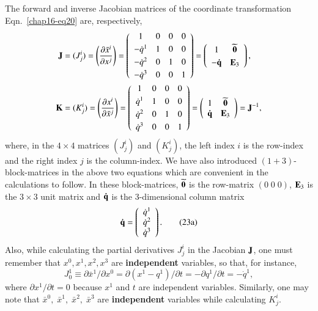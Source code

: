 The forward and inverse Jacobian matrices of the coordinate transformation  Eqn.~\eqref{chap16-eq20} are, respectively, 
\begin{align}
\mathbf{J} &=(J^i_j)=\left(\frac{\partial \bar{x}^i}{\partial x^j}\right)=\left(\begin{array}{cccc}1&0&0&0\\[3pt]
-\dot{q}^{1}&1&0&0\\[3pt]
-\dot{q}^{2}&0&1&0 \\[3pt]
-\dot{q}^{3}&0&0&1 \end{array}\right)
=\left(\begin{array}{cc} 1 & \widetilde{\mathbf{0}}\\[3pt]
-\mathbf{\dot{q}} & \mathbf{E}_3 \end{array}\right),\label{chap16-eq22} \\
\mathbf{K}&=(K^i_j)=\left(\frac{\partial x^i}{\partial 
\bar x^j}\right)=\left(\begin{array}{cccc}1&0&0&0\\[3pt]
\dot{q}^{1}&1&0&0\\[3pt]
\dot{q}^{2}&0&1&0 \\[3pt]
\dot{q}^{3}&0&0&1 \end{array}\right)
= \left(\begin{array}{cc} 1 &\widetilde{\mathbf{0}}\\
\mathbf{\dot{q}} & {\mathbf{E}}_3 \end{array}\right)
=\mathbf{J}^{-1},\label{chap16-eq23}
\end{align}
where, in the $4\times4$ matrices $(J^i_j)$ and $(K^i_j)$, the left  index $i$ is the row-index and the right index $j$ is the column-index.  We have also introduced $(1+3)$-block-matrices in the above two equations which are convenient in the calculations to follow. In these block-matrices,  $\widetilde{\mathbf{0}}$ is the row-matrix $(0\;0\;0)$, $\mathbf{E}_3$  is the $3\times 3$ unit matrix and  $\mathbf{\dot{q}}$ is the 3-dimensional column matrix
\begin{align*}
\mathbf{\dot{q}}=\left(\begin{array}{c}\dot{q}^{1}\\ \dot{q}^2 \\
\dot{q}^3\end{array}\right).  \tag{23a}\label{chap16-eq23a}
\end{align*}
Also, while  calculating the partial derivatives  $J^i_j$ in the Jacobian ${\mathbf{J}}$, one must remember that $x^0, x^1, x^2, x^3$ are \textbf{independent} variables, so that, for instance, 
$$
J^1_0\equiv\partial \bar{x}^1/ \partial x^0 =\partial(x^1-q^1)/ \partial t = -\partial q^1/\partial t=-\dot{q}^1,
$$
where $\partial x^1/\partial t=0$ because $x^1$ and $t$ are independent variables. Similarly, one may note that $\bar{x}^0,\; \bar{x}^1,\;  \bar{x}^2,\;  \bar{x}^3$ are \textbf{independent} variables while calculating $K^i_j$.

